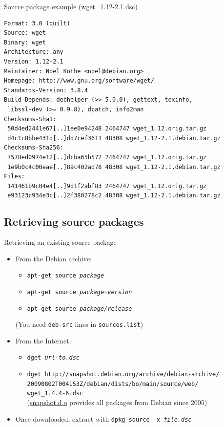 \documentclass[10pt,final]{beamer}
\begin{document}
\begin{frame}[fragile]{Source package example (wget\_1.12-2.1.dsc)}
  \begin{lstlisting}[basicstyle=\ttfamily\small]
Format: 3.0 (quilt)
Source: wget
Binary: wget
Architecture: any
Version: 1.12-2.1
Maintainer: Noel Kothe <noel@debian.org>
Homepage: http://www.gnu.org/software/wget/
Standards-Version: 3.8.4
Build-Depends: debhelper (>> 5.0.0), gettext, texinfo,
 libssl-dev (>= 0.9.8), dpatch, info2man
Checksums-Sha1: 
 50d4ed2441e67[..]1ee0e94248 2464747 wget_1.12.orig.tar.gz
 d4c1c8bbe431d[..]dd7cef3611 48308 wget_1.12-2.1.debian.tar.gz
Checksums-Sha256: 
 7578ed0974e12[..]dcba65b572 2464747 wget_1.12.orig.tar.gz
 1e9b0c4c00eae[..]89c402ad78 48308 wget_1.12-2.1.debian.tar.gz
Files: 
 141461b9c04e4[..]9d1f2abf83 2464747 wget_1.12.orig.tar.gz
 e93123c934e3c[..]2f380278c2 48308 wget_1.12-2.1.debian.tar.gz
\end{lstlisting}
\end{frame}

\subsection{Retrieving source packages}
\begin{frame}{Retrieving an existing source package}
  \begin{itemize}
  \item From the Debian archive:
    \begin{itemize}
    \item \texttt{apt-get source \textsl{package}}
    \item \texttt{apt-get source \textsl{package=version}}
    \item \texttt{apt-get source \textsl{package/release}}
    \end{itemize}
    (You need \texttt{deb-src} lines in \texttt{sources.list})
    \br
  \item From the Internet:
    \begin{itemize}
    \item \texttt{dget \textsl{url-to.dsc}}
    \item \texttt{dget http://snapshot.debian.org/archive/debian-archive/\\20090802T004153Z/debian/dists/bo/main/source/web/\\
        wget\_1.4.4-6.dsc}\\ 
      (\href{http://snapshot.debian.org/}{\ttfamily snapshot.d.o} provides all packages from Debian since 2005)
    \end{itemize}
    \br
  \item Once downloaded, extract with \texttt{dpkg-source -x \textsl{file.dsc}}
  \end{itemize}
\end{frame}
\end{document}
